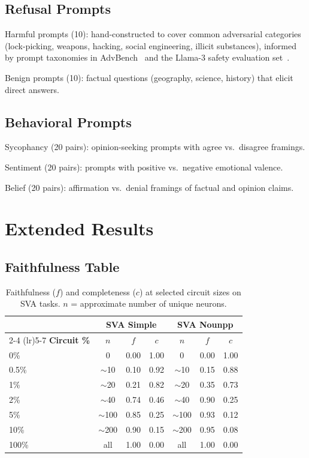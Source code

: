 \documentclass[11pt]{article}
\begin{document}
\subsection{Refusal Prompts}

Harmful prompts (10): hand-constructed to cover common adversarial categories (lock-picking, weapons, hacking, social engineering, illicit substances), informed by prompt taxonomies in AdvBench~\citep{zou2023representation} and the Llama-3 safety evaluation set~\citep{dubey2024llama3}.

Benign prompts (10): factual questions (geography, science, history) that elicit direct answers.

\subsection{Behavioral Prompts}

Sycophancy (20 pairs): opinion-seeking prompts with agree vs.\ disagree framings.

Sentiment (20 pairs): prompts with positive vs.\ negative emotional valence.

Belief (20 pairs): affirmation vs.\ denial framings of factual and opinion claims.


\section{Extended Results}
\label{sec:extended_results}

\subsection{Faithfulness Table}

\begin{table}[htbp]
\centering
\caption{Faithfulness ($f$) and completeness ($c$) at selected circuit sizes on SVA tasks. $n$ = approximate number of unique neurons.}
\label{tab:faithfulness_full}
\small
\begin{tabular}{lcccccc}
\toprule
& \multicolumn{3}{c}{\textbf{SVA Simple}} & \multicolumn{3}{c}{\textbf{SVA Nounpp}} \\
\cmidrule(lr){2-4} \cmidrule(lr){5-7}
\textbf{Circuit \%} & $n$ & $f$ & $c$ & $n$ & $f$ & $c$ \\
\midrule
0\%    & 0         & 0.00 & 1.00 & 0         & 0.00 & 1.00 \\
0.5\%  & $\sim$10  & 0.10 & 0.92 & $\sim$10  & 0.15 & 0.88 \\
1\%    & $\sim$20  & 0.21 & 0.82 & $\sim$20  & 0.35 & 0.73 \\
2\%    & $\sim$40  & 0.74 & 0.46 & $\sim$40  & 0.90 & 0.25 \\
5\%    & $\sim$100 & 0.85 & 0.25 & $\sim$100 & 0.93 & 0.12 \\
10\%   & $\sim$200 & 0.90 & 0.15 & $\sim$200 & 0.95 & 0.08 \\
100\%  & all       & 1.00 & 0.00 & all       & 1.00 & 0.00 \\
\bottomrule
\end{tabular}
\end{table}
\end{document}
